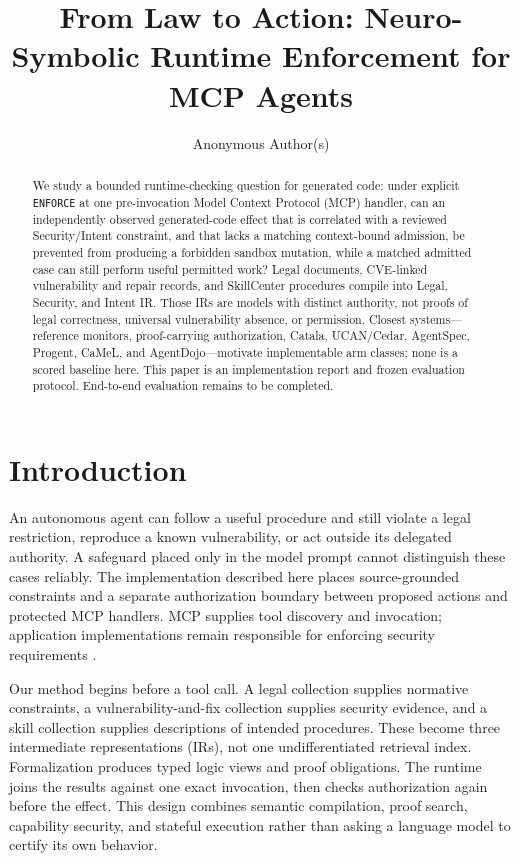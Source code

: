 \documentclass{article}
\title{From Law to Action: Neuro-Symbolic Runtime Enforcement for MCP Agents}
\author{Anonymous Author(s)}
\begin{document}
\maketitle
\begin{abstract}
We study a bounded runtime-checking question for generated code: under explicit \texttt{ENFORCE} at one pre-invocation Model Context Protocol (MCP) handler, can an independently observed generated-code effect that is correlated with a reviewed Security/Intent constraint, and that lacks a matching context-bound admission, be prevented from producing a forbidden sandbox mutation, while a matched admitted case can still perform useful permitted work? Legal documents, CVE-linked vulnerability and repair records, and SkillCenter procedures compile into Legal, Security, and Intent IR. Those IRs are models with distinct authority, not proofs of legal correctness, universal vulnerability absence, or permission. Closest systems---reference monitors, proof-carrying authorization, Catala, UCAN/Cedar, AgentSpec, Progent, CaMeL, and AgentDojo---motivate implementable arm classes; none is a scored baseline here. This paper is an implementation report and frozen evaluation protocol. End-to-end evaluation remains to be completed.
\end{abstract}

\section{Introduction}

An autonomous agent can follow a useful procedure and still violate a legal restriction, reproduce a known vulnerability, or act outside its delegated authority. A safeguard placed only in the model prompt cannot distinguish these cases reliably. The implementation described here places source-grounded constraints and a separate authorization boundary between proposed actions and protected MCP handlers. MCP supplies tool discovery and invocation; application implementations remain responsible for enforcing security requirements \citep{mcp,mcp-auth}.

Our method begins before a tool call. A legal collection supplies normative constraints, a vulnerability-and-fix collection supplies security evidence, and a skill collection supplies descriptions of intended procedures. These become three intermediate representations (IRs), not one undifferentiated retrieval index. Formalization produces typed logic views and proof obligations. The runtime joins the results against one exact invocation, then checks authorization again before the effect. This design combines semantic compilation, proof search, capability security, and stateful execution rather than asking a language model to certify its own behavior.
\end{document}
